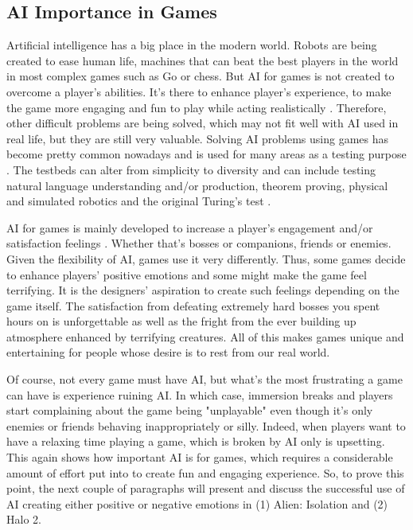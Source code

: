 \documentclass[journal]{IEEEtran}
\begin{document}
\subsection{AI Importance in Games} %
Artificial intelligence has a big place in the modern world. Robots are being created to ease human life, machines that can beat the best players in the world in most complex games such as Go \cite{alphago} or chess. But AI for games is not created to overcome a player's abilities. It's there to enhance player's experience, to make the game more engaging and fun to play \cite{aiinvideogames} while acting realistically \cite{chaslot2008monte}. Therefore, other difficult problems are being solved, which may not fit well with AI used in real life, but they are still very valuable. Solving AI problems using games has become pretty common nowadays and is used for many areas as a testing purpose \cite{schaul2011measuring}. The testbeds can alter from simplicity to diversity \cite{schaul2011measuring} and can include testing natural language understanding and/or production, theorem proving, physical and simulated robotics and the original Turing's test \cite{schaul2011measuring}.

AI for games is mainly developed to increase a player's engagement and/or satisfaction feelings \cite{halo2}. Whether that's bosses or companions, friends or enemies. Given the flexibility of AI, games use it very differently. Thus, some games decide to enhance players' positive emotions and some might make the game feel terrifying. It is the designers' aspiration to create such feelings depending on the game itself. The satisfaction from defeating extremely hard bosses you spent hours on is unforgettable as well as the fright from the ever building up atmosphere enhanced by terrifying creatures. All of this makes games unique and entertaining for people whose desire is to rest from our real world.

Of course, not every game must have AI, but what's the most frustrating a game can have is experience ruining AI. In which case, immersion breaks and players start complaining about the game being "unplayable" even though it's only enemies or friends behaving inappropriately or silly. Indeed, when players want to have a relaxing time playing a game, which is broken by AI only is upsetting. This again shows how important AI is for games, which requires a considerable amount of effort put into to create fun and engaging experience. So, to prove this point, the next couple of paragraphs will present and discuss the successful use of AI creating either positive or negative emotions in (1) Alien: Isolation and (2) Halo 2.
\end{document}
